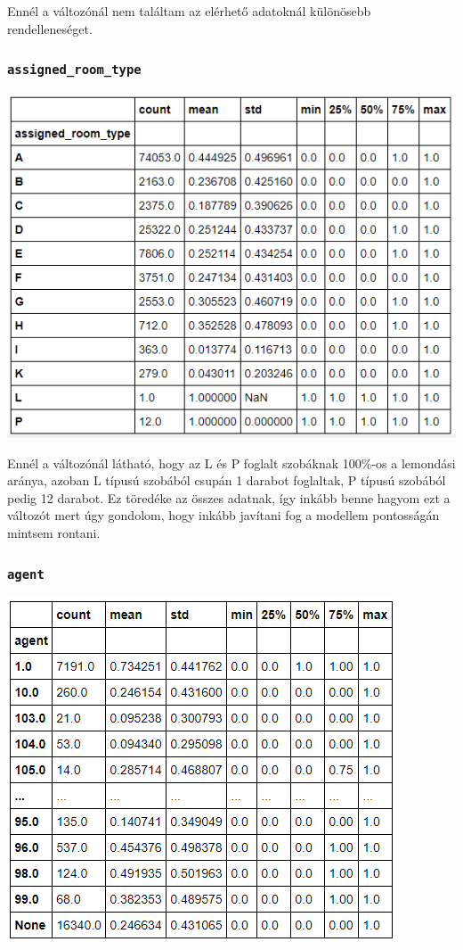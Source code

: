 Ennél a változónál nem találtam az elérhető adatoknál különösebb rendelleneséget.

\subsubsection{\texttt{assigned\_room\_type}}
\includegraphics{images/4.fejezet/4.korrelacios4.png}

Ennél a változónál látható, hogy az L és P foglalt szobáknak 100\%-os a lemondási aránya, azoban L típusú szobából csupán 1 darabot foglaltak, P típusú szobából pedig 12 darabot. Ez töredéke az összes adatnak, így inkább benne hagyom ezt a változót mert úgy gondolom, hogy inkább javítani fog a modellem pontosságán mintsem rontani.

\subsubsection{\texttt{agent}}
\includegraphics{images/4.fejezet/4.korrelacios5.PNG}

